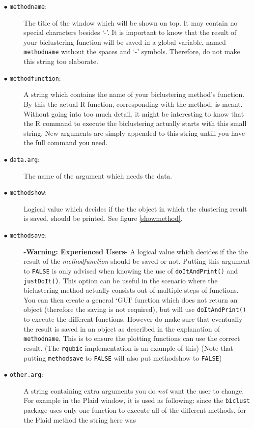 \documentclass[a4paper]{article}\usepackage[]{graphicx}\usepackage[]{color}
\begin{document}
\begin{description}
  \item[$\bullet$ \texttt{methodname}:] The title of the window which will be
  shown on top. It may contain no special characters besides `-'. It is
  important to know that the result of your biclustering function will be saved in
  a global variable, named \verb|methodname| without the spaces and `-' symbols.
  Therefore, do not make this string too elaborate.
  \item[$\bullet$ \texttt{methodfunction}:] A string which contains the name of
  your biclustering method's function. By this the actual R function,
  corresponding with the method, is meant.
  Without going into too much detail, it might be interesting to know that the 
 R command to execute the biclustering actually starts with this small string.
 New arguments are simply appended to this string untill you have the full
 command you need.
  \item[$\bullet$ \texttt{data.arg}:] The name of the argument which needs the
  data.
  \item[$\bullet$ \texttt{methodshow}:] Logical value which decides if the the
  object in which the clustering result is saved, should be printed. See figure
  \ref{showmethod}.
  \item[$\bullet$ \texttt{methodsave}:] {\bf -Warning: Experienced Users-} A logical value which decides if the
  the result of the {\it methodfunction} should be saved or not. Putting this
  argument to \verb|FALSE| is only advised when knowing the use of
  \verb|doItAndPrint()| and \verb|justDoIt()|. This option can be useful in the
  scenario where the biclustering method actually consists out of multiple steps
  of functions. You can then create a general `GUI' function which does not
  return an object (therefore the saving is not required), but will use
  \verb|doItAndPrint()| to execute the different functions. However do make sure
  that eventually the result is saved in an object as described in the
  explanation of \verb|methodname|. This is to ensure the plotting functions can
  use the correct result. (The \verb|rqubic| implementation is an example of this) 
  (Note that putting \verb|methodsave| to \verb|FALSE| will also put methodshow
  to \verb|FALSE|)
  \item[$\bullet$ \texttt{other.arg}:] A string containing extra arguments you
  do {\it not} want the user to change. For example in the Plaid window, it is
  used as following: since the \verb|biclust| package uses only one function to
  execute all of the different methods, for the Plaid method the string here was

\end{description}
\end{document}
